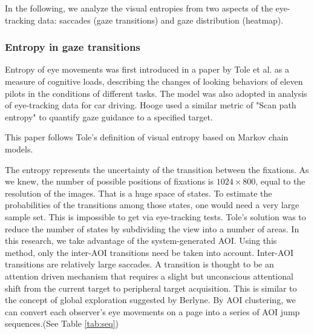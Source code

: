 In the following, we analyze the visual entropies from two aspects of the eye-tracking data: saccades (gaze transitions) and gaze distribution (heatmap).

\subsubsection{Entropy in gaze transitions}
Entropy of eye movements was first introduced in a paper by Tole et al.\cite{Tole1983} as a measure of cognitive loads, describing the changes of looking behaviors of eleven pilots in the conditions of different tasks. The model was also adopted in analysis of eye-tracking data for car driving\cite{Gilland2008}. Hooge\cite{Hooge2013} used a similar metric of "Scan path entropy" to quantify gaze guidance to a specified target.

This paper follows Tole's definition of visual entropy based on Markov chain models.

The entropy represents the uncertainty of the transition between the fixations. As we knew, the number of possible positions of fixations is $1024\times800$, equal to the resolution of the images. That is a huge space of states. To estimate the probabilities of the transitions among those states, one would need a very large sample set. This is impossible to get via eye-tracking tests. Tole's solution was to reduce the number of states by subdividing the view into a number of areas. In this research, we take advantage of the system-generated AOI. Using this method, only the inter-AOI transitions need be taken into account. Inter-AOI transitions are relatively large saccades. A transition is thought to be an attention driven mechanism that requires a slight but unconscious attentional shift from the current target to peripheral target acquisition\cite{Henderson1993}. This is similar to the concept of global exploration suggested by Berlyne\cite{Berlyne1971}. By AOI clustering, we can convert each observer's eye movements on a page into a series of AOI jump sequences.(See Table \ref{tab:seq})

